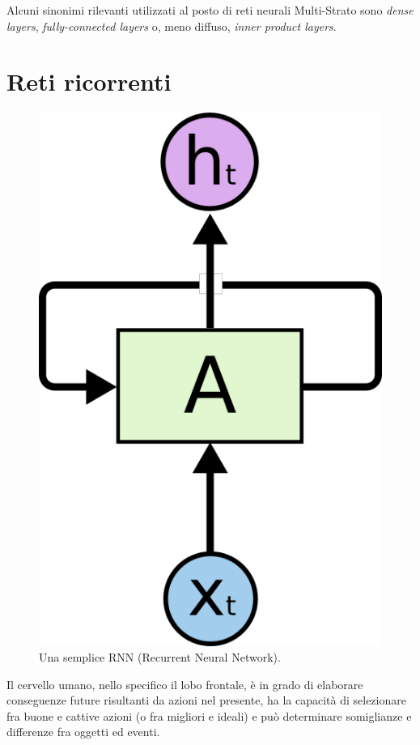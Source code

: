 Alcuni sinonimi rilevanti utilizzati al posto di reti neurali Multi-Strato 
sono \textit{dense layers}, \textit{fully-connected layers} o, meno diffuso, \textit{inner product layers}.
\section{Reti ricorrenti}
\begin{figure}[ht]
	\centering
	\includegraphics{img/RNN.png}
	\caption{Una semplice RNN (Recurrent Neural Network).}
	\label{fig:1.4}
\end{figure}
Il cervello umano, nello specifico il lobo frontale, è in grado di elaborare conseguenze future risultanti da azioni nel presente, ha la capacità di selezionare fra buone e cattive azioni (o fra migliori e ideali) e può determinare somiglianze e differenze fra oggetti ed eventi.

